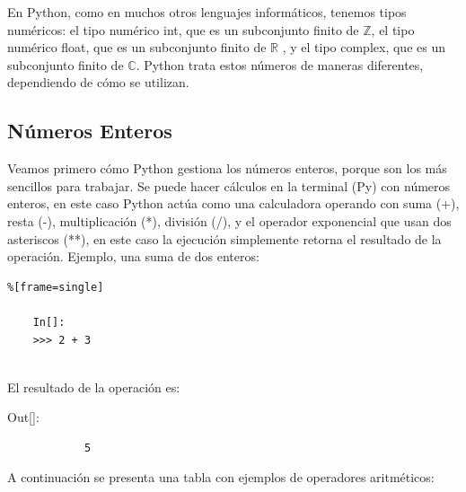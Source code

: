 En Python, como en muchos otros lenguajes informáticos, tenemos tipos numéricos: el tipo numérico {\ttfamily int}, que es un subconjunto finito de  $\mathds{Z}$, el tipo numérico {\ttfamily float}, que es un subconjunto finito de $\mathds{R}$ , y el  tipo {\ttfamily complex}, que es un subconjunto finito de $\mathds{C}$. Python trata estos números de  maneras diferentes, dependiendo de cómo se utilizan. 


\subsection{Números Enteros}

Veamos primero cómo Python gestiona los números enteros, porque son los más sencillos para trabajar.
Se puede hacer cálculos en la terminal (Py) con números enteros, en este caso  Python actúa como una calculadora  operando con  suma {\ttfamily(+)}, resta {\ttfamily(-)}, multiplicación {\ttfamily(*)}, división  {\ttfamily(/)},  y el operador  exponencial  que usan  dos asteriscos {\ttfamily(**)}, en este caso la ejecución simplemente  retorna el resultado de la operación. Ejemplo, una suma de dos enteros:
\begin{lstlisting}%[frame=single]
	
	In[]:
	>>> 2 + 3
	
\end{lstlisting}El resultado de la operación es:\\

{\ttfamily\scriptsize\scriptsize 
	\hspace{-0.65cm}Out[]:\vspace{-0.15cm}	
	{\color{blue} 	
		\begin{verbatim}
			5
		\end{verbatim}
}}

A continuación se presenta una tabla con ejemplos de operadores aritméticos:

